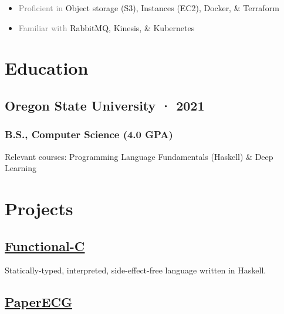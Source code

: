 \documentclass[12pt]{article} %
\providecommand{\tightlist}{%
  \setlength{\itemsep}{0pt}\setlength{\parskip}{0pt}}
\let\defaultref\href
\renewcommand{\href}[2]{%
  \defaultref{#1}{\ul{#2}}%
}
\renewcommand{\emph}[1]{%
  \textcolor{gray}{#1}%
}
\begin{document}
\begin{paracol}{2}
\begin{raggedright}
\begin{itemize}
\tightlist
\item
  \emph{Proficient in} Object storage (S3), Instances (EC2), Docker, \&
  Terraform
\item
  \emph{Familiar with} RabbitMQ, Kinesis, \& Kubernetes
\end{itemize}

\hypertarget{education}{%
\section{Education}\label{education}}

\hypertarget{oregon-state-university-2021}{%
\subsection{Oregon State University ·
2021}\label{oregon-state-university-2021}}

\vspace{-5pt}

\hypertarget{b.s.-computer-science-4.0-gpa}{%
\subsubsection{B.S., Computer Science (4.0
GPA)}\label{b.s.-computer-science-4.0-gpa}}

Relevant courses: Programming Language Fundamentals (Haskell) \& Deep
Learning

\hypertarget{projects}{%
\section{Projects}\label{projects}}

\hypertarget{functional-c}{%
\subsection{\texorpdfstring{\href{https://github.com/julianfortune/CS381Project}{Functional-C}}{Functional-C}}\label{functional-c}}

Statically-typed, interpreted, side-effect-free language written in
Haskell.

\hypertarget{paperecg}{%
\subsection{\texorpdfstring{\href{https://github.com/Tereshchenkolab/paper-ecg}{PaperECG}}{PaperECG}}\label{paperecg}}


\end{raggedright}
\end{paracol}
\end{document}
